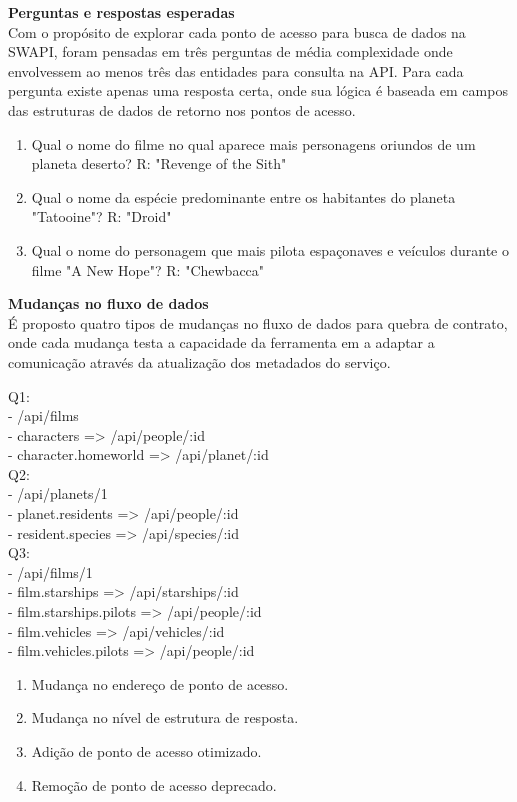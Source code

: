 \textbf{Perguntas e respostas esperadas} \\

Com o propósito de explorar cada ponto de acesso para busca de dados na SWAPI, foram pensadas em três perguntas de média complexidade onde envolvessem ao menos três das entidades para consulta na API. Para cada pergunta existe apenas uma resposta certa, onde sua lógica é baseada em campos das estruturas de dados de retorno nos pontos de acesso.

\begin{enumerate}
\item Qual o nome do filme no qual aparece mais personagens oriundos de um planeta deserto? R: "Revenge of the Sith"
\item Qual o nome da espécie predominante entre os habitantes do planeta "Tatooine"? R: "Droid"
\item Qual o nome do personagem que mais pilota espaçonaves e veículos durante o filme "A New Hope"? R: "Chewbacca"
\end{enumerate}

\textbf{Mudanças no fluxo de dados} \\

É proposto quatro tipos de mudanças no fluxo de dados para quebra de contrato, onde cada mudança testa a capacidade da ferramenta em a adaptar a comunicação através da atualização dos metadados do serviço.

Q1:\\
- /api/films\\
- characters => /api/people/:id\\
- character.homeworld => /api/planet/:id\\

Q2:\\
- /api/planets/1\\
- planet.residents => /api/people/:id\\
- resident.species => /api/species/:id\\

Q3:\\
- /api/films/1\\
- film.starships => /api/starships/:id\\
- film.starships.pilots => /api/people/:id\\
- film.vehicles => /api/vehicles/:id\\
- film.vehicles.pilots => /api/people/:id\\

\begin{enumerate}
\item Mudança no endereço de ponto de acesso.
\item Mudança no nível de estrutura de resposta.
\item Adição de ponto de acesso otimizado.
\item Remoção de ponto de acesso deprecado.
\end{enumerate}

